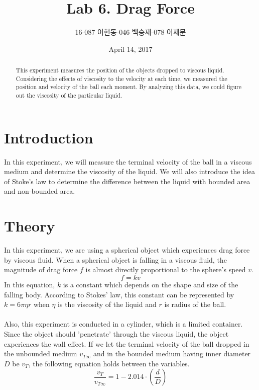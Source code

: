 \documentclass[a4paper]{article}
\title{Lab 6. Drag Force}
\author{16-087 이현동\quad 16-046 백승재\quad 16-078 이재문}
\date{April 14, 2017}
\begin{document}
\maketitle

\begin{abstract}
This experiment measures the position of the objects dropped to viscous liquid. Considering the effects of viscosity to the velocity at each time, we measured the position and velocity of the ball each moment. By analyzing this data, we could figure out the viscosity of the particular liquid.
\end{abstract}

\section{Introduction}
In this experiment, we will measure the terminal velocity of the ball in a viscous medium and determine the viscosity of the liquid. We will also introduce the idea of Stoke's law to determine the difference between the liquid with bounded area and non-bounded area.
\section{Theory}
In this experiment, we are using a spherical object which experiences drag force by viscous fluid. When a spherical object is falling in a viscous fluid, the magnitude of drag force $f$ is almost directly proportional to the sphere's speed $v$. 
\begin{equation}
f = kv
\end{equation}
In this equation, $k$ is a constant which depends on the shape and size of the falling body. According to Stokes' law, this constant can be represented by $k = 6 \pi \eta r$ when $\eta$ is the viscosity of the liquid and $r$ is radius of the ball.\\ \\
Also, this experiment is conducted in a cylinder, which is a limited container. Since the object should 'penetrate' through the viscous liquid, the object experiences the wall effect. If we let the terminal velocity of the ball dropped in the unbounded medium $v_{T \infty}$ and in the bounded medium having inner diameter $D$ be $v_T$, the following equation holds between the variables.
\begin{equation}
\displaystyle \frac{v_T}{v_{T \infty}} = 1 - 2.014 \cdot \left(\frac{d}{D}\right)
\end{equation}
\end{document}
